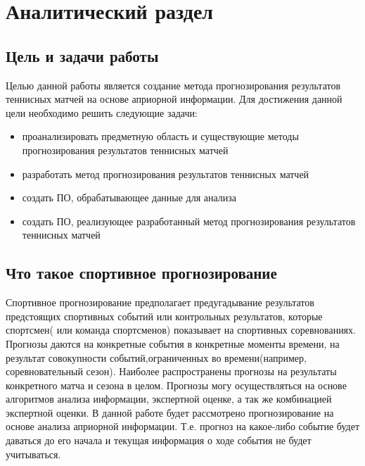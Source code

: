 \chapter{Аналитический раздел}
\label{cha:analysis}
\section{Цель и задачи работы}
Целью данной работы является создание метода прогнозирования результатов теннисных матчей на основе априорной информации.
Для достижения данной цели необходимо решить следующие задачи:
\begin{itemize}
	
\item проанализировать предметную область и существующие методы прогнозирования результатов теннисных матчей
	\item разработать метод прогнозирования результатов теннисных матчей
	\item создать ПО, обрабатывающее данные для анализа
	\item создать ПО, реализующее  разработанный метод прогнозирования результатов теннисных матчей
\end{itemize}
\section{Что такое спортивное прогнозирование}
Спортивное прогнозирование предполагает предугадывание результатов предстоящих спортивных событий или контрольных результатов, которые спортсмен( или команда спортсменов) показывает на спортивных соревнованиях\cite{Book01}. Прогнозы даются на конкретные события в конкретные моменты времени, на результат совокупности событий,ограниченных во времени(например, соревновательный сезон). Наиболее распространены прогнозы на результаты конкретного матча и сезона в целом. Прогнозы могу осуществляться на основе алгоритмов анализа информации, экспертной оценке, а так же комбинацией экспертной оценки. В данной работе будет рассмотрено прогнозирование на основе анализа априорной информации. Т.е. прогноз на какое-либо событие будет даваться до его начала и текущая информация о ходе события не будет учитываться.


